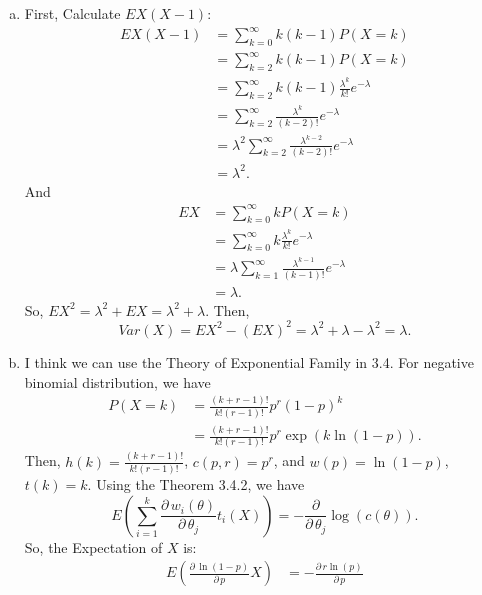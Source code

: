 \documentclass[14pt]{elegantbook}
\begin{document}
    \begin{solution}
        \begin{enumerate}[(a)]
            \item First, Calculate $EX(X-1)$: 
            \begin{align*}
                EX(X-1)&=\sum_{k=0}^{\infty}k(k-1)P(X=k)\\
                &=\sum_{k=2}^{\infty}k(k-1)P(X=k)\\
                &=\sum_{k=2}^{\infty}k(k-1)\frac{\lambda^k}{k!}e^{-\lambda}\\
                &=\sum_{k=2}^{\infty}\frac{\lambda^k}{(k-2)!}e^{-\lambda}\\
                &=\lambda^2\sum_{k=2}^{\infty}\frac{\lambda^{k-2}}{(k-2)!}e^{-\lambda}\\
                &=\lambda^2. 
            \end{align*}
            And \begin{align*}
                EX&=\sum_{k=0}^{\infty}kP(X=k)\\
                &=\sum_{k=0}^{\infty}k\frac{\lambda^k}{k!}e^{-\lambda}\\
                &=\lambda\sum_{k=1}^{\infty}\frac{\lambda^{k-1}}{(k-1)!}e^{-\lambda}\\
                &=\lambda.
            \end{align*}
            So, $EX^2=\lambda^2+EX=\lambda^2+\lambda$. Then, 
            \[Var(X)=EX^2-(EX)^2=\lambda^2+\lambda-\lambda^2=\lambda. \]
            \item \label{3.22.b} I think we can use the Theory of Exponential Family in 3.4. For negative binomial distribution, we have
            \begin{align*}
                P(X=k)&=\frac{(k+r-1)!}{k!(r-1)!}p^r(1-p)^k\\
                &=\frac{(k+r-1)!}{k!(r-1)!}p^r\exp\left(k\ln(1-p)\right). 
            \end{align*}
            Then, $h(k)=\frac{(k+r-1)!}{k!(r-1)!}$, $c(p, r)=p^r$, and $w(p)=\ln(1-p)$, $t(k)=k$. Using the Theorem 3.4.2, we have
            \[
                E\left(\sum_{i=1}^k\frac{\partial\,w_i(\theta)}{\partial\,\theta_j}t_i(X)\right)=-\frac{\partial}{\partial\,\theta_j}\log(c(\theta)).
            \]
            So, the Expectation of $X$ is: 
            \begin{align*}
                E\left(\frac{\partial\,\ln(1-p)}{\partial\,p}X\right)&=-\frac{\partial\,r\ln(p)}{\partial\,p}\\

\end{align*}
\end{enumerate}
\end{solution}
\end{document}
